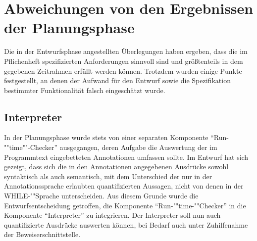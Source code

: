 \section{Abweichungen von den Ergebnissen der Planungsphase}
Die in der Entwurfsphase angestellten Überlegungen haben ergeben, dass die im Pflichenheft spezifizierten Anforderungen sinnvoll sind und größtenteils in dem gegebenen Zeitrahmen erfüllt werden können. Trotzdem wurden einige Punkte festgestellt, an denen der Aufwand für den Entwurf sowie die Spezifikation bestimmter Funktionalität falsch eingeschätzt wurde.

\subsection{Interpreter}
In der Planungsphase wurde stets von einer separaten Komponente ``Run-""time""-Checker'' ausgegangen, deren Aufgabe die Auswertung der im Programmtext eingebetteten Annotationen umfassen sollte. Im Entwurf hat sich gezeigt, dass sich die in den Annotationen angegebenen Ausdrücke sowohl syntaktisch als auch semantisch, mit dem Unterschied der nur in der Annotationssprache erlaubten quantifizierten Aussagen, nicht von denen in der WHILE-""Sprache unterscheiden. Aus diesem Grunde wurde die Entwurfsentscheidung getroffen, die Komponente ``Run-""time-""Checker'' in die Komponente ``Interpreter'' zu integrieren. Der Interpreter soll nun auch quantifizierte Ausdrücke auswerten können, bei Bedarf auch unter Zuhilfenahme der Beweiserschnittstelle.
